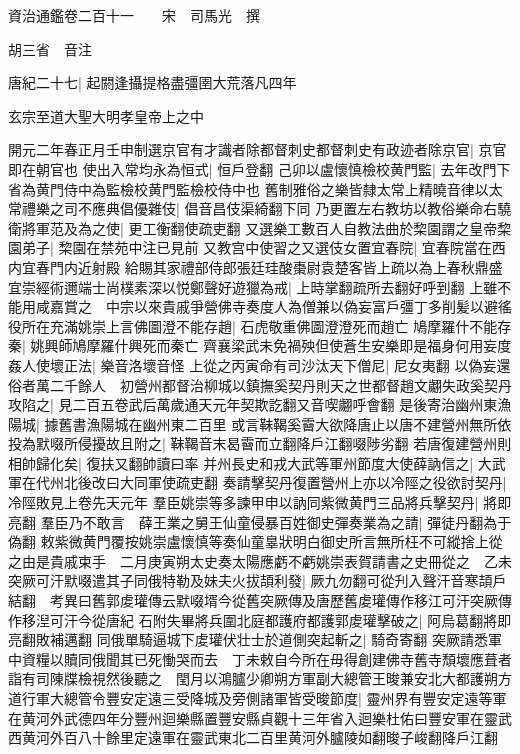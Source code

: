 資治通鑑卷二百十一　　宋　司馬光　撰

胡三省　音注

唐紀二十七|{
	起閼逢攝提格盡彊圉大荒落凡四年}


玄宗至道大聖大明孝皇帝上之中

開元二年春正月壬申制選京官有才識者除都督刺史都督刺史有政迹者除京官|{
	京官即在朝官也}
使出入常均永為恒式|{
	恒戶登翻}
己卯以盧懷慎檢校黄門監|{
	去年改門下省為黄門侍中為監檢校黄門監檢校侍中也}
舊制雅俗之樂皆隸太常上精曉音律以太常禮樂之司不應典倡優雜伎|{
	倡音昌伎渠綺翻下同}
乃更置左右教坊以教俗樂命右驍衛將軍范及為之使|{
	更工衡翻使疏吏翻}
又選樂工數百人自教法曲於棃園謂之皇帝棃園弟子|{
	棃園在禁苑中注已見前}
又教宫中使習之又選伎女置宜春院|{
	宜春院當在西内宜春門内近射殿}
給賜其家禮部侍郎張廷珪酸棗尉袁楚客皆上疏以為上春秋鼎盛宜崇經術邇端士尚樸素深以悦鄭聲好遊獵為戒|{
	上時掌翻疏所去翻好呼到翻}
上雖不能用咸嘉賞之　中宗以來貴戚爭營佛寺奏度人為僧兼以偽妄富戶彊丁多削髪以避徭役所在充滿姚崇上言佛圖澄不能存趙|{
	石虎敬重佛圖澄澄死而趙亡}
鳩摩羅什不能存秦|{
	姚興師鳩摩羅什興死而秦亡}
齊襄梁武未免禍殃但使蒼生安樂即是福身何用妄度姦人使壞正法|{
	樂音洛壞音怪}
上從之丙寅命有司沙汰天下僧尼|{
	尼女夷翻}
以偽妄還俗者萬二千餘人　初營州都督治柳城以鎮撫奚契丹則天之世都督趙文翽失政奚契丹攻陷之|{
	見二百五卷武后萬歲通天元年契欺訖翻又音喫翽呼會翻}
是後寄治幽州東漁陽城|{
	據舊書漁陽城在幽州東二百里}
或言靺鞨奚霫大欲降唐止以唐不建營州無所依投為默啜所侵擾故且附之|{
	靺鞨音末曷霫而立翻降戶江翻啜陟劣翻}
若唐復建營州則相帥歸化矣|{
	復扶又翻帥讀曰率}
并州長史和戎大武等軍州節度大使薛訥信之|{
	大武軍在代州北後改曰大同軍使疏吏翻}
奏請擊契丹復置營州上亦以冷陘之役欲討契丹|{
	冷陘敗見上卷先天元年}
羣臣姚崇等多諫甲申以訥同紫微黄門三品將兵擊契丹|{
	將即亮翻}
羣臣乃不敢言　薛王業之舅王仙童侵暴百姓御史彈奏業為之請|{
	彈徒丹翻為于偽翻}
敕紫微黄門覆按姚崇盧懷慎等奏仙童辠狀明白御史所言無所枉不可縱捨上從之由是貴戚束手　二月庚寅朔太史奏太陽應虧不虧姚崇表賀請書之史冊從之　乙未突厥可汗默啜遣其子同俄特勒及妹夫火拔頡利發|{
	厥九勿翻可從刋入聲汗音寒頡戶結翻　考異曰舊郭䖍瓘傳云默啜壻今從舊突厥傳及唐歷舊䖍瓘傳作移江可汗突厥傳作移湼可汗今從唐紀}
石附失畢將兵圍北庭都護府都護郭䖍瓘擊破之|{
	阿烏葛翻將即亮翻敗補邁翻}
同俄單騎逼城下䖍瓘伏壮士於道側突起斬之|{
	騎奇寄翻}
突厥請悉軍中資糧以贖同俄聞其已死慟哭而去　丁未敕自今所在毋得創建佛寺舊寺頹壞應葺者詣有司陳牒檢視然後聽之　閠月以鴻臚少卿朔方軍副大總管王晙兼安北大都護朔方道行軍大總管令豐安定遠三受降城及旁側諸軍皆受晙節度|{
	靈州界有豐安定遠等軍在黄河外武德四年分豐州迴樂縣置豐安縣貞觀十三年省入迴樂杜佑曰豐安軍在靈武西黄河外百八十餘里定遠軍在靈武東北二百里黄河外臚陵如翻晙子峻翻降戶江翻}
